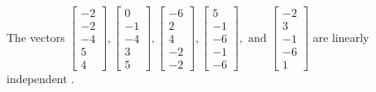 \begin{exercise}
\begin{exerciseStatement}
  \end{exerciseStatement}
  \begin{exerciseAnswer}
   The vectors \(\left[\begin{array}{r}
-2 \\
-2 \\
-4 \\
5 \\
4
\end{array}\right] , \left[\begin{array}{r}
0 \\
-1 \\
-4 \\
3 \\
5
\end{array}\right] , \left[\begin{array}{r}
-6 \\
2 \\
4 \\
-2 \\
-2
\end{array}\right] , \left[\begin{array}{r}
5 \\
-1 \\
-6 \\
-1 \\
-6
\end{array}\right] , \text{ and } \left[\begin{array}{r}
-2 \\
3 \\
-1 \\
-6 \\
1
\end{array}\right]\) are 
  	 linearly independent  .
  


  \end{exerciseAnswer}
\end{exercise}